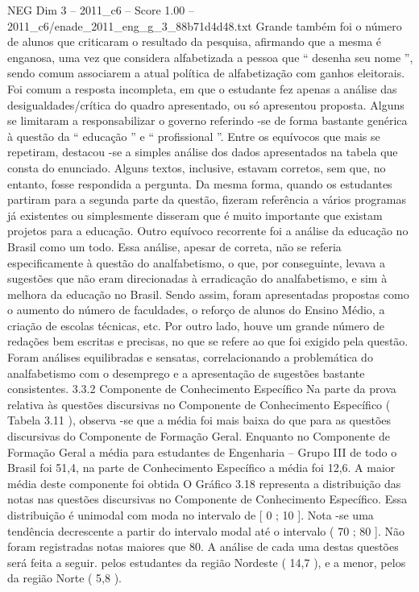 \begin{textsample}{NEG Dim 3 – 2011\_c6 – Score 1.00 – 2011\_c6/enade\_2011\_eng\_g\_3\_88b71d4d48.txt}
Grande também foi o número de alunos que criticaram o resultado da pesquisa, afirmando que a mesma é enganosa, uma vez que considera alfabetizada a pessoa que “ desenha seu nome ”, sendo comum associarem a atual política de alfabetização com ganhos eleitorais.
Foi comum a resposta incompleta, em que o estudante fez apenas a análise das desigualdades/crítica do quadro apresentado, ou só apresentou proposta.
Alguns se limitaram a responsabilizar o governo referindo -se de forma bastante genérica à questão da “ educação ” e “ profissional ”.
Entre os equívocos que mais se repetiram, destacou -se a simples análise dos dados apresentados na tabela que consta do enunciado.
Alguns textos, inclusive, estavam corretos, sem que, no entanto, fosse respondida a pergunta.
Da mesma forma, quando os estudantes partiram para a segunda parte da questão, fizeram referência a vários programas já existentes ou simplesmente disseram que é muito importante que existam projetos para a educação.
Outro equívoco recorrente foi a análise da educação no Brasil como um todo.
Essa análise, apesar de correta, não se referia especificamente à questão do analfabetismo, o que, por conseguinte, levava a sugestões que não eram direcionadas à erradicação do analfabetismo, e sim à melhora da educação no Brasil.
Sendo assim, foram apresentadas propostas como o aumento do número de faculdades, o reforço de alunos do Ensino Médio, a criação de escolas técnicas, etc.
Por outro lado, houve um grande número de redações bem escritas e precisas, no que se refere ao que foi exigido pela questão.
Foram análises equilibradas e sensatas, correlacionando a problemática do analfabetismo com o desemprego e a apresentação de sugestões bastante consistentes. 3.3.2 Componente de Conhecimento Específico Na parte da prova relativa às questões discursivas no Componente de Conhecimento Específico ( Tabela 3.11 ), observa -se que a média foi mais baixa do que para as questões discursivas do Componente de Formação Geral.
Enquanto no Componente de Formação Geral a média para estudantes de Engenharia – Grupo III de todo o Brasil foi 51,4, na parte de Conhecimento Específico a média foi 12,6.
A maior média deste componente foi obtida O Gráfico 3.18 representa a distribuição das notas nas questões discursivas no Componente de Conhecimento Específico.
Essa distribuição é unimodal com moda no intervalo de [ 0 ; 10 ].
Nota -se uma tendência decrescente a partir do intervalo modal até o intervalo ( 70 ; 80 ].
Não foram registradas notas maiores que 80.
A análise de cada uma destas questões será feita a seguir. pelos estudantes da região Nordeste ( 14,7 ), e a menor, pelos da região Norte ( 5,8 ).

\end{textsample}
